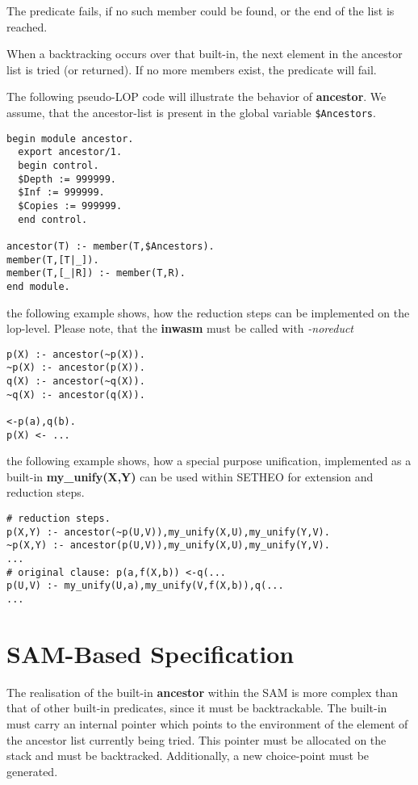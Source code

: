 The predicate fails, if no such member could be found, or the end of
the list is reached.

When a backtracking occurs over that built-in, the next element in the
ancestor list is tried (or returned). If no more members exist, the predicate
will fail.

The following pseudo-LOP code will illustrate the behavior of {\bf ancestor}.
We assume, that the ancestor-list is present in the global variable
{\tt \$Ancestors}.

\begin{verbatim}
begin module ancestor.
  export ancestor/1.
  begin control.
  $Depth := 999999.
  $Inf := 999999.
  $Copies := 999999.
  end control.

ancestor(T) :- member(T,$Ancestors).
member(T,[T|_]).
member(T,[_|R]) :- member(T,R).
end module.
\end{verbatim}

the following example shows, how the reduction steps
can be implemented on the lop-level. Please note, that the {\bf inwasm}
must be called with {\em -noreduct}

\begin{verbatim}
p(X) :- ancestor(~p(X)).
~p(X) :- ancestor(p(X)).
q(X) :- ancestor(~q(X)).
~q(X) :- ancestor(q(X)).

<-p(a),q(b).
p(X) <- ...
\end{verbatim}

the following example shows, how a special purpose unification, implemented
as a built-in {\bf my\_unify(X,Y)} can be used within SETHEO for
extension and reduction steps.

\begin{verbatim}
# reduction steps.
p(X,Y) :- ancestor(~p(U,V)),my_unify(X,U),my_unify(Y,V).
~p(X,Y) :- ancestor(p(U,V)),my_unify(X,U),my_unify(Y,V).
...
# original clause: p(a,f(X,b)) <-q(...
p(U,V) :- my_unify(U,a),my_unify(V,f(X,b)),q(...
...
\end{verbatim}

\section{SAM-Based Specification}

The realisation of the built-in {\bf ancestor} within the SAM is
more complex than that of other built-in predicates, since
it must be backtrackable. The built-in must carry an internal pointer
which points to the environment of the element of the ancestor list
currently being tried. This pointer must be allocated on the stack and
must be backtracked. Additionally, a new choice-point must be generated.

